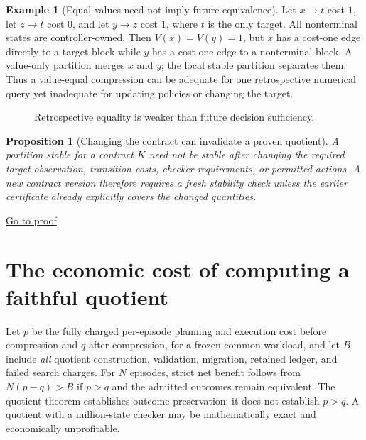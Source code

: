 \documentclass[11pt,letterpaper]{article}
\newtheorem{proposition}[theorem]{Proposition}
\theoremstyle{definition}
\newtheorem{example}[theorem]{Example}
\theoremstyle{remark}
\newcommand{\backproof}[1]{\hfill\hyperlink{proof:#1}{\footnotesize Go to proof}}
\begin{document}
\begin{example}[Equal values need not imply future equivalence]\label{ex:eqcost}
Let $x\to t$ cost $1$, let $z\to t$ cost $0$, and let $y\to z$ cost $1$, where $t$ is the only target. All nonterminal states are controller-owned. Then $V(x)=V(y)=1$, but $x$ has a cost-one edge directly to a target block while $y$ has a cost-one edge to a nonterminal block. A value-only partition merges $x$ and $y$; the local stable partition separates them. Thus a value-equal compression can be adequate for one retrospective numerical query yet inadequate for updating policies or changing the target.
\end{example}

\begin{figure}[ht]
\centering{}
\caption{Retrospective equality is weaker than future decision sufficiency.}
\end{figure}

\begin{proposition}[Changing the contract can invalidate a proven quotient]\label{prop:newcontract}\hypertarget{stmt:newcontract}{}
A partition stable for a contract $K$ need not be stable after changing the required target observation, transition costs, checker requirements, or permitted actions. A new contract version therefore requires a fresh stability check unless the earlier certificate already explicitly covers the changed quantities.
\end{proposition}\backproof{newcontract}

\section{The economic cost of computing a faithful quotient}
Let $p$ be the fully charged per-episode planning and execution cost before compression and $q$ after compression, for a frozen common workload, and let $B$ include \emph{all} quotient construction, validation, migration, retained ledger, and failed search charges. For $N$ episodes, strict net benefit follows from $N(p-q)>B$ if $p>q$ and the admitted outcomes remain equivalent. The quotient theorem establishes outcome preservation; it does not establish $p>q$. A quotient with a million-state checker may be mathematically exact and economically unprofitable.
\end{document}

